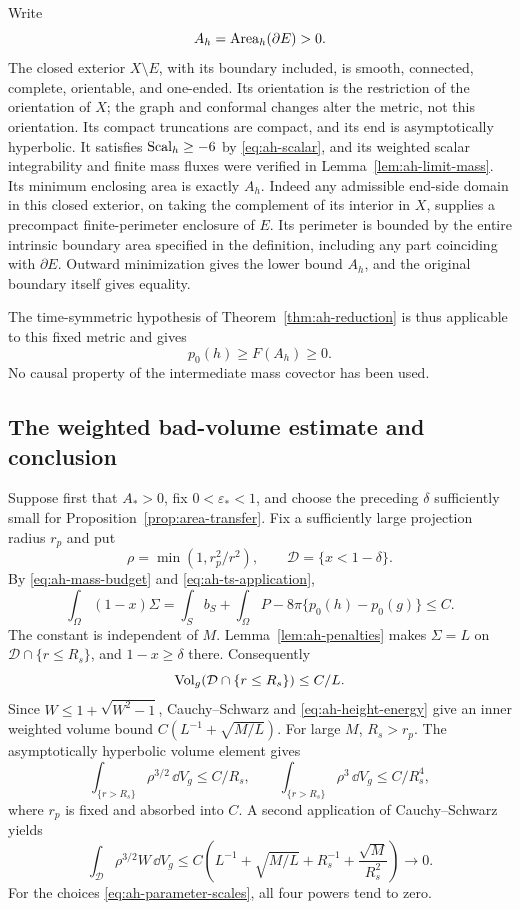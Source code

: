 Write
\begin{equation}\label{eq:ah-hull-area}
 A_h=\operatorname{Area}_h(\partial E)>0.
\end{equation}
The closed exterior \(X\setminus E\), with its boundary
included, is smooth, connected, complete, orientable, and one-ended.
Its orientation is the restriction of the orientation of \(X\);
the graph and conformal changes alter the metric, not this orientation.
Its compact truncations are compact, and its end is
asymptotically hyperbolic.  It satisfies
\(\operatorname{Scal}_h\ge-6\) by \eqref{eq:ah-scalar}, and its
weighted scalar integrability and finite mass fluxes
were verified in Lemma~\ref{lem:ah-limit-mass}.
Its minimum enclosing area is exactly \(A_h\).
Indeed any admissible end-side domain in this closed
exterior, on taking the complement of its interior
in \(X\), supplies a precompact finite-perimeter
enclosure of \(E\).  Its perimeter is bounded by the
entire intrinsic boundary area specified in the
definition, including any part coinciding with
\(\partial E\).  Outward minimization gives the
lower bound \(A_h\), and the original boundary
itself gives equality.

The time-symmetric hypothesis of
Theorem~\ref{thm:ah-reduction} is thus applicable to
this fixed metric and gives
\begin{equation}\label{eq:ah-ts-application}
 p_0(h)\ge F(A_h)\ge0.
\end{equation}
No causal property of the intermediate mass covector
has been used.

\subsection{The weighted bad-volume estimate and conclusion}

Suppose first that \(A_*>0\), fix \(0<\varepsilon_*<1\),
and choose the preceding \(\delta\) sufficiently small
for Proposition~\ref{prop:area-transfer}.
Fix a sufficiently large projection radius \(r_p\)
and put
\[
 \rho=\min(1,r_p^2/r^2),\qquad
 \mathcal D=\{x<1-\delta\}.
\]
By \eqref{eq:ah-mass-budget} and
\eqref{eq:ah-ts-application},
\[
 \int_\Omega(1-x)\Sigma
 =\int_S b_S+\int_\Omega P
       -8\pi\{p_0(h)-p_0(g)\}\le C.
\]
The constant is independent of \(M\).
Lemma~\ref{lem:ah-penalties} makes
\(\Sigma=L\) on \(\mathcal D\cap\{r\le R_s\}\),
and \(1-x\ge\delta\) there.  Consequently
\[
 \operatorname{Vol}_g(\mathcal D\cap\{r\le R_s\})\le C/L.
\]
Since \(W\le1+\sqrt{W^2-1}\), Cauchy--Schwarz and
\eqref{eq:ah-height-energy} give an inner weighted
volume bound \(C(L^{-1}+\sqrt{M/L})\).
For large \(M\), \(R_s>r_p\).  The asymptotically
hyperbolic volume element gives
\[
 \int_{\{r>R_s\}}\rho^{3/2}\,\dd V_g\le C/R_s,\qquad
 \int_{\{r>R_s\}}\rho^3\,\dd V_g\le C/R_s^4 ,
\]
where \(r_p\) is fixed and absorbed into \(C\).
A second application of Cauchy--Schwarz yields
\begin{equation}\label{eq:ah-bad-volume}
 \int_{\mathcal D}\rho^{3/2}W\,\dd V_g
 \le C\left(L^{-1}+\sqrt{M/L}
                  +R_s^{-1}+\frac{\sqrt M}{R_s^2}\right)
 \longrightarrow0 .
\end{equation}
For the choices \eqref{eq:ah-parameter-scales},
all four powers tend to zero.

